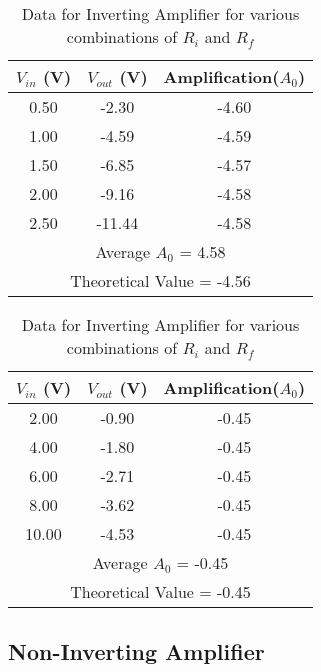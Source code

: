 \documentclass[12pt]{article}
\begin{document}
\begin{table}[H]
  \bigskip
  \bigskip

  \begin{subtable}{0.48\textwidth}
    \centering
    \begin{tabular}{|c|c|c|}
        \hline
        $V_{in}$ (V) & $V_{out}$ (V) & Amplification($A_0$) \\
        \hline
        0.50 & -2.30 & -4.60 \\
        1.00 & -4.59 & -4.59 \\
        1.50 & -6.85 & -4.57 \\
        2.00 & -9.16 & -4.58 \\
        2.50 & -11.44 & -4.58 \\
        \hline
        \multicolumn{3}{|c|}{Average $A_0$ = 4.58} \\
        \multicolumn{3}{|c|}{Theoretical Value = -4.56} \\
        \hline
    \end{tabular}
    \caption{$R_i=2160\Omega, R_f=9850\Omega$}
    \label{tab:first}
\end{subtable}
\hfill
\begin{subtable}{0.48\textwidth}
    \centering
    \begin{tabular}{|c|c|c|}
        \hline
        $V_{in}$ (V) & $V_{out}$ (V) & Amplification($A_0$) \\
        \hline
        2.00 & -0.90 & -0.45 \\
        4.00 & -1.80 & -0.45 \\
        6.00 & -2.71 & -0.45 \\
        8.00 & -3.62 & -0.45 \\
        10.00 & -4.53 & -0.45 \\
        \hline
        \multicolumn{3}{|c|}{Average $A_0$ = -0.45} \\
        \multicolumn{3}{|c|}{Theoretical Value = -0.45} \\
        \hline
    \end{tabular}
    \caption{$R_i=21800\Omega, R_f=9850\Omega$}
    \label{tab:second}
    \end{subtable}
  \caption{Data for Inverting Amplifier for various combinations of $R_i$ and $R_f$}
  \label{tab:combined}
\end{table}

\subsection*{Non-Inverting Amplifier}
\end{document}
